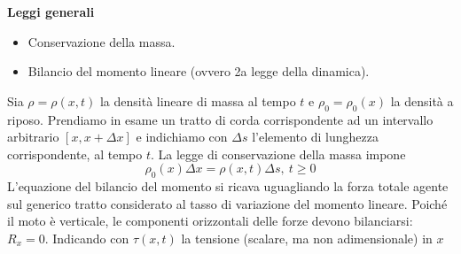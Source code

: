 \documentclass[10pt,a4paper,twoside,openright]{book}
\begin{document}
\textbf{Leggi generali}
\begin{itemize}
    \item Conservazione della massa.
    \item Bilancio del momento lineare (ovvero 2a legge della dinamica).
\end{itemize}

Sia $\displaystyle \rho =\rho (x,t)$ la densità lineare di massa al tempo $t$ e $\displaystyle \rho _{0} =\rho _{0}(x)$ la densità a riposo. Prendiamo in esame un tratto di corda corrispondente ad un intervallo arbitrario $\displaystyle [ x,x+\Delta x]$ e indichiamo con $\displaystyle \Delta s$ l'elemento di lunghezza corrispondente, al tempo $t$. La legge di conservazione della massa impone
\begin{equation*}
    \rho _{0}(x) \Delta x=\rho (x,t) \Delta s,\ t\geqslant 0
\end{equation*}
L'equazione del bilancio del momento si ricava uguagliando la forza totale agente sul generico tratto considerato al tasso di variazione del momento lineare. Poiché il moto è verticale, le componenti orizzontali delle forze devono bilanciarsi: $R_{x}=0$. Indicando con $\displaystyle \tau (x,t)$ la tensione (scalare, ma non adimensionale) in $x$
\end{document}
